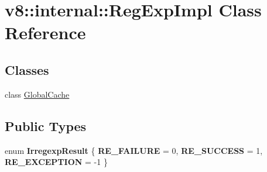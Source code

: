 \hypertarget{classv8_1_1internal_1_1RegExpImpl}{}\section{v8\+:\+:internal\+:\+:Reg\+Exp\+Impl Class Reference}
\label{classv8_1_1internal_1_1RegExpImpl}
\subsection*{Classes}
\begin{DoxyCompactItemize}
\item 
class \mbox{\hyperlink{classv8_1_1internal_1_1RegExpImpl_1_1GlobalCache}{Global\+Cache}}
\end{DoxyCompactItemize}
\subsection*{Public Types}
\begin{DoxyCompactItemize}
\item 
\mbox{\label{classv8_1_1internal_1_1RegExpImpl_a67a89cafc8ce13f1efbdc9147ce2542e}} 
enum {\bfseries Irregexp\+Result} \{ {\bfseries R\+E\+\_\+\+F\+A\+I\+L\+U\+RE} = 0, 
{\bfseries R\+E\+\_\+\+S\+U\+C\+C\+E\+SS} = 1, 
{\bfseries R\+E\+\_\+\+E\+X\+C\+E\+P\+T\+I\+ON} = -\/1
 \}
\end{DoxyCompactItemize}
